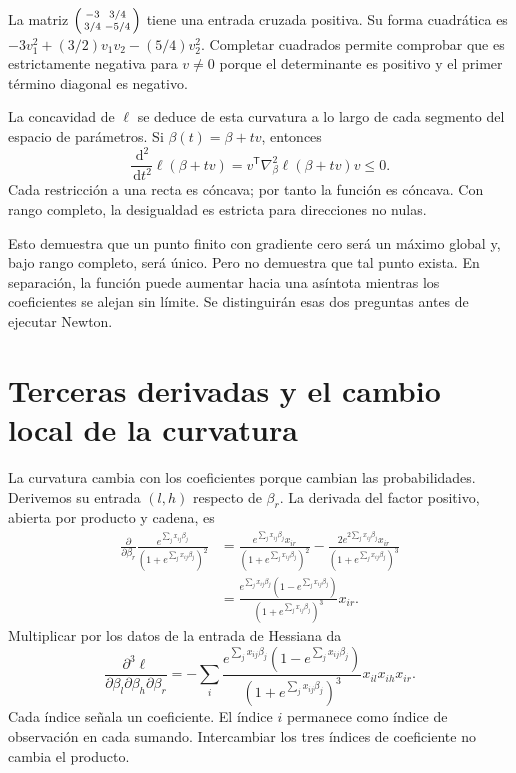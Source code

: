 \documentclass[11pt,a4paper]{article}
\newcommand{\T}{^{\mathsf T}}
\newcommand{\dd}{\,\mathrm d}
\begin{document}
\begin{ejemplo}
La matriz
$\begin{psmallmatrix}-3&3/4\\3/4&-5/4\end{psmallmatrix}$
tiene una entrada cruzada positiva.
Su forma cuadrática es
$-3v_1^2+(3/2)v_1v_2-(5/4)v_2^2$.
Completar cuadrados permite comprobar que es estrictamente negativa
para $v\ne0$ porque el determinante es positivo y el primer término
diagonal es negativo.
\end{ejemplo}
La concavidad de $\ell$ se deduce de esta curvatura a lo largo de
cada segmento del espacio de parámetros.
Si $\beta(t)=\beta+tv$, entonces
\[
\frac{\dd^2}{\dd t^2}\ell(\beta+tv)
=v\T\nabla_\beta^2\ell(\beta+tv)v\le0.
\]
Cada restricción a una recta es cóncava; por tanto la función es cóncava.
Con rango completo, la desigualdad es estricta para direcciones no nulas.

Esto demuestra que un punto finito con gradiente cero será un máximo
global y, bajo rango completo, será único.
Pero no demuestra que tal punto exista.
En separación, la función puede aumentar hacia una asíntota
mientras los coeficientes se alejan sin límite.
Se distinguirán esas dos preguntas antes de ejecutar Newton.

\clearpage
\section{Terceras derivadas y el cambio local de la curvatura}\label{logit30}
La curvatura cambia con los coeficientes porque cambian las
probabilidades. Derivemos su entrada $(l,h)$ respecto de $\beta_r$.
La derivada del factor positivo, abierta por producto y cadena, es
\[
\begin{aligned}
\frac{\partial}{\partial\beta_r}
\frac{e^{\sum_jx_{ij}\beta_j}}{(1+e^{\sum_jx_{ij}\beta_j})^2}
&=\frac{e^{\sum_jx_{ij}\beta_j}x_{ir}}{(1+e^{\sum_jx_{ij}\beta_j})^2}
-\frac{2e^{2\sum_jx_{ij}\beta_j}x_{ir}}{(1+e^{\sum_jx_{ij}\beta_j})^3}\\
&=\frac{e^{\sum_jx_{ij}\beta_j}(1-e^{\sum_jx_{ij}\beta_j})}
{(1+e^{\sum_jx_{ij}\beta_j})^3}x_{ir}.
\end{aligned}
\]
Multiplicar por los datos de la entrada de Hessiana da
\[
\boxed{\frac{\partial^3\ell}
{\partial\beta_l\partial\beta_h\partial\beta_r}
=-\sum_i
\frac{e^{\sum_jx_{ij}\beta_j}(1-e^{\sum_jx_{ij}\beta_j})}
{(1+e^{\sum_jx_{ij}\beta_j})^3}x_{il}x_{ih}x_{ir}}.
\]
Cada índice señala un coeficiente.
El índice $i$ permanece como índice de observación en cada sumando.
Intercambiar los tres índices de coeficiente no cambia el producto.
\end{document}
